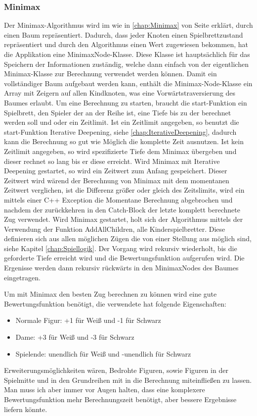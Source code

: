 \documentclass[12pt,a4paper,bibliography=totocnumbered,listof=totocnumbered]{article}
\begin{document}
\subsubsection{Minimax}
Der Minimax-Algorithmus wird im wie in \ref{chap:Minimax} von Seite \pageref{chap:Minimax} erklärt, durch einen Baum repräsentiert. Dadurch, dass jeder Knoten einen Spielbrettzustand
repräsentiert und durch den Algorithmus einen Wert zugewiesen bekommen, hat die Applikation eine MinimaxNode-Klasse.
Diese Klasse ist hauptsächlich für das Speichern der Informationen zuständig, welche dann einfach von der eigentlichen Minimax-Klasse zur Berechnung
verwendet werden können. Damit ein vollständiger Baum aufgebaut werden kann, enthält die Minimax-Node-Klasse ein Array mit Zeigern auf allen 
Kindknoten, was eine Vorwärtstraversierung des Baumes erlaubt. 
Um eine Berechnung zu starten, braucht die start-Funktion ein Spielbrett, den Spieler der an der Reihe ist, eine
Tiefe bis zu der berechnet werden soll und oder ein Zeitlimit. Ist ein Zeitlimit angegeben, so benutzt die start-Funktion Iterative Deepening, siehe
\ref{chap:IterativeDeepening}, dadurch kann die Berechnung so gut wie Möglich die komplette Zeit ausnutzen. Ist kein Zeitlimit angegeben, 
so wird spezifizierte Tiefe dem Minimax übergeben und dieser rechnet so lang bis er diese erreicht. Wird Minimax mit Iterative Deepening gestartet, so
wird ein Zeitwert zum Anfang gespeichert. Dieser Zeitwert wird wärend der Berechnung von Minimax mit dem momentanen Zeitwert verglichen, ist die 
Differenz größer oder gleich des Zeitslimits, wird ein mittels einer C++ Exception die Momentane Berechnung abgebrochen und nachdem der zurückkehren in 
den Catch-Block der letzte komplett berechnete Zug verwendet. 
Wird Minimax gestartet, holt sich der Algorithmus mittels der Verwendung der Funktion AddAllChildren, alle Kinderspielbretter. Diese 
definieren sich aus allen möglichen Zügen die von einer Stellung aus möglich sind, siehe Kapitel \ref{chap:Spiellogik}. Der Vorgang wird 
rekursiv wiederholt, bis die geforderte Tiefe erreicht wird und die Bewertungsfunktion aufgerufen wird. Die Ergenisse werden dann rekursiv rückwärts in 
den MinimaxNodes des Baumes eingetragen.

Um mit Minimax den besten Zug berechnen zu können wird eine gute Bewertungsfunktion 
benötigt, die verwendete hat folgende Eigenschaften:
\begin{itemize}
    \item Normale Figur: +1 für Weiß und -1 für Schwarz
    \item Dame: +3 für Weiß und -3 für Schwarz
    \item Spielende: unendlich für Weiß und -unendlich für Schwarz
\end{itemize} 
Erweiterungsmöglichkeiten wären, Bedrohte Figuren, sowie Figuren in der Spielmitte und in den Grundreihen mit in die Berechnung miteinfließen zu lassen.
Man muss ich aber immer vor Augen halten, dass eine komplexere Bewertungsfunktion mehr Berechnungszeit benötigt, aber bessere Ergebnisse liefern könnte.
\end{document}

